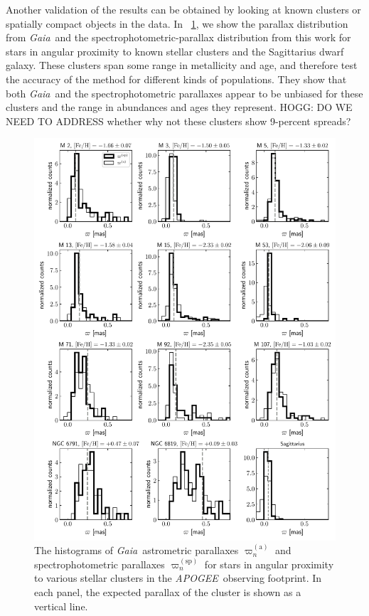 \documentclass[modern]{aastex62}
\newcommand{\acronym}[1]{{\small{#1}}}
\newcommand{\project}[1]{\textsl{#1}}
\newcommand{\apogee}{\project{\acronym{APOGEE}}}
\newcommand{\gaia}{\project{Gaia}}
\newcommand{\gparallax}{\varpi^{(\mathrm{a})}}
\newcommand{\sparallax}{\varpi^{(\mathrm{sp})}}
\begin{document}
Another validation of the results can be obtained by looking at known
clusters or spatially compact objects in the data.
In \figurename~\ref{fig:clusters}, we show the parallax distribution from \gaia\ and
the spectrophotometric-parallax distribution from this work for stars in
angular proximity to known stellar clusters and the Sagittarius dwarf
galaxy.
These clusters span some range in metallicity and age, and therefore test
the accuracy of the method for different kinds of populations.
They show that both \gaia\ and the spectrophotometric parallaxes appear to be unbiased
for these clusters and the range in abundances and ages they represent.
HOGG: DO WE NEED TO ADDRESS whether why not these clusters show 9-percent spreads?
\begin{figure}
\includegraphics[width=\textwidth]{clusters.pdf}
\caption{The histograms of \gaia\ astrometric parallaxes $\gparallax_n$
  and spectrophotometric parallaxes $\sparallax_n$ for stars in angular proximity
  to various stellar clusters in the \apogee\ observing footprint. In each panel,
  the expected parallax of the cluster is shown as a vertical line.\label{fig:clusters}}
\end{figure}
\end{document}
